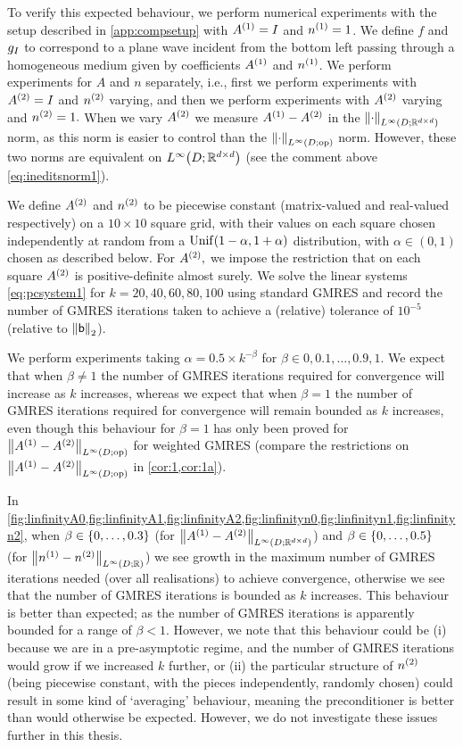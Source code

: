 To verify this expected behaviour, we perform numerical experiments with the setup described in \cref{app:compsetup} with ${A}^{(1)} = I$ and ${n}^{(1)} = 1$. We define $f$ and $g_{I}$ to correspond to a plane wave incident from the bottom left passing through a homogeneous medium given by coefficients ${A}^{(1)}$ and ${n}^{(1)}$. We perform experiments for $A$ and $n$ separately, i.e., first we perform experiments with ${A}^{(2)}=I$ and ${n}^{(2)}$ varying, and then we perform experiments with ${A}^{(2)}$ varying and ${n}^{(2)}=1.$ When we vary ${A}^{(2)}$ we measure ${A}^{(1)}-{A}^{(2)}$ in the $\NLiDRRdtd{\cdot}$ norm, as this norm is easier to control than the $\NLiDop{\cdot}$ norm. However, these two norms are equivalent on $\LiDRRdtd$ (see the comment above \cref{eq:ineditsnorm1}).

We define ${A}^{(2)}$ and ${n}^{(2)}$ to be piecewise constant (matrix-valued and real-valued respectively) on a $10\times10$ square grid, with their values on each square chosen independently at random from a $\Unif\mleft(1-\alpha,1+\alpha\mright)$ distribution, with $\alpha \in (0,1)$ chosen as described below. For ${A}^{(2)},$ we impose the restriction that on each square ${A}^{(2)}$ is positive-definite almost surely. We solve the linear systems \cref{eq:pcsystem1} for $k = 20,40,60,80,100$ using standard GMRES and record the number of GMRES iterations taken to achieve a (relative) tolerance of $10^{-5}$ (relative to $\Nt{\bvec}$).

We perform experiments taking $\alpha = 0.5 \times k^{-\beta}$ for $\beta \in 0,0.1,\ldots,0.9,1.$ We expect that when $\beta \neq 1$  the number of GMRES iterations required for convergence will increase as $k$ increases, whereas we expect that when $\beta = 1$ the number of GMRES iterations required for convergence will remain bounded as $k$ increases, even though this behaviour for $\beta=1$ has only been proved for $\NLiDop{\Aso-\Ast}$ for weighted GMRES (compare the restrictions on $\NLiDop{\Aso-\Ast}$ in \cref{cor:1,cor:1a}).


In \cref{fig:linfinityA0,fig:linfinityA1,fig:linfinityA2,fig:linfinityn0,fig:linfinityn1,fig:linfinityn2}, when $\beta \in \set{0,\ldots,0.3}$ (for $\NLiDRRdtd{\Aso-\Ast}$) and $\beta \in \set{0,\ldots,0.5}$ (for $\NLiDRR{\nso-\nst}$) we see growth in the maximum number of GMRES iterations needed (over all realisations) to achieve convergence, otherwise we see that the number of GMRES iterations is bounded as $k$ increases. This behaviour is better than expected; as the number of GMRES iterations is apparently bounded for a range of $\beta < 1.$ However, we note that this behaviour could be (i) because we are in a pre-asymptotic regime, and the number of GMRES iterations would grow if we increased $k$ further, or (ii) the particular structure of ${n}^{(2)}$ (being piecewise constant, with the pieces independently, randomly chosen) could result in some kind of `averaging' behaviour, meaning the preconditioner is better than would otherwise be expected. However, we do not investigate these issues further in this thesis.

